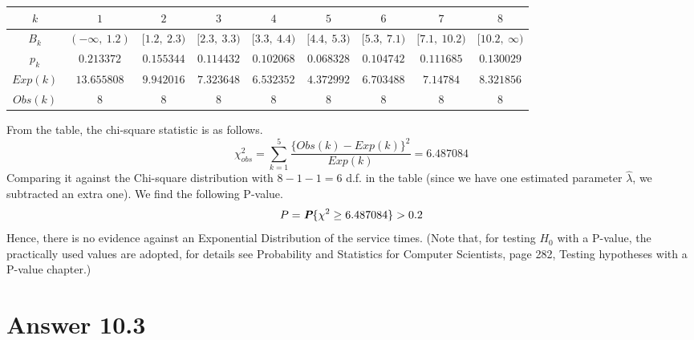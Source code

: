 \documentclass[11pt]{article}
\begin{document}
\begin{table}[H]
\begin{center}
\begin{tabular}{ | c | c | c | c | c | c | c | c | c |} 
\hline
$k$ & $1$ & $2$ & $3$ & $4$ & $5$ & $6$ & $7$ & $8$ \\
\hline
$B_k$ & $(-\infty, \ 1.2)$ & $[1.2, \ 2.3)$ & $[2.3, \ 3.3)$ & $[3.3, \ 4.4)$ & $[4.4, \ 5.3)$ & $[5.3, \ 7.1)$ & $[7.1, \ 10.2)$ & $[10.2, \ \infty)$ \\
\hline
$p_k$ & $0.213372$ & $0.155344$ & $0.114432$ & $0.102068$ & $0.068328$ & $0.104742$ & $0.111685$ & $0.130029$ \\
\hline
$Exp(k)$ & $13.655808$ & $9.942016$ & $7.323648$ & $6.532352$ & $4.372992$ & $6.703488$ & $7.14784$ & $8.321856$ \\
\hline
$Obs(k)$ & $8$ & $8$ & $8$ & $8$ & $8$ & $8$ & $8$ & $8$ \\
\hline
\end{tabular}
\end{center}
\end{table}
From the table, the chi-square statistic is as follows.
\begin{equation}
	\chi^2_{obs} = \sum\limits_{k = 1}^{5}\frac{\{Obs(k) - Exp(k)\}^2}{Exp(k)} = 6.487084
\end{equation}
Comparing it against the Chi-square distribution with $8 - 1 - 1 = 6$ d.f. in the table (since we have one estimated parameter $\hat{\lambda}$, we subtracted an extra one). We find the following P-value.
\begin{equation}
	P = \textit{\textbf{P}}\{\chi^2 \geq 6.487084\} > 0.2
\end{equation}
Hence, there is no evidence against an Exponential Distribution of the service times. (Note that, for testing $H_0$ with a P-value, the practically used values are adopted, for details see Probability and Statistics for Computer Scientists, page 282, Testing hypotheses with a P-value chapter.)
\section*{Answer 10.3}
\end{document}
